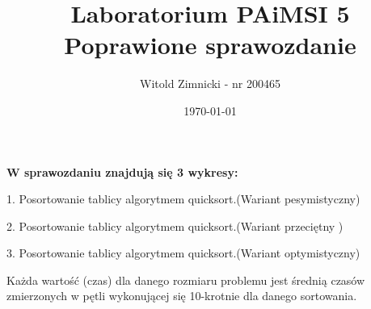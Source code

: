 \documentclass[12pt,a4paper,titlepage]{article}
\title{Laboratorium PAiMSI 5\newline
Poprawione sprawozdanie}
\date{\today}
\author{Witold Zimnicki - nr 200465}
\begin{document}
	\maketitle
	\pagestyle{empty}
	\pagestyle{headings}
	
	\textbf{W sprawozdaniu znajdują się 3 wykresy:}\newline
	
	1. Posortowanie tablicy algorytmem quicksort.(Wariant pesymistyczny) \newline
	 
	2. Posortowanie tablicy algorytmem quicksort.(Wariant przeciętny ) \newline
	
	3. Posortowanie tablicy algorytmem quicksort.(Wariant optymistyczny) \newline
	
	
	
	Każda wartość (czas) dla danego rozmiaru problemu jest średnią czasów zmierzonych w pętli wykonującej się 10-krotnie dla danego sortowania. \newline
	\newline
	\newline
	\newpage
	
\end{document}
